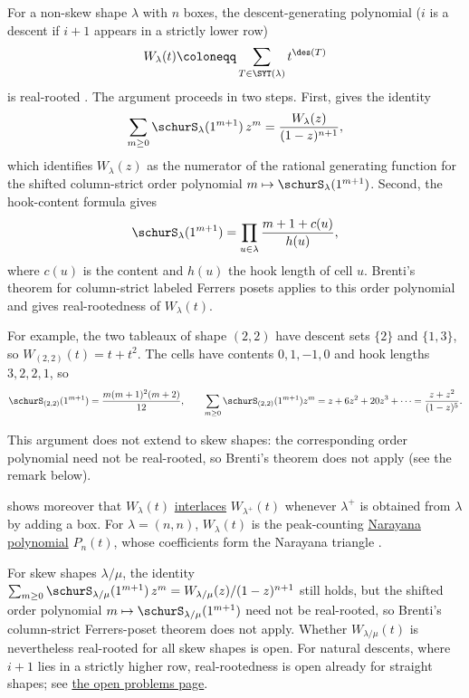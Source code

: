 \begin{example*}

For a non-skew shape $\lambda$ with $n$ boxes, the descent-generating polynomial
($i$ is a descent if $i+1$ appears in a strictly lower row)
\[
   W_\lambda(t) \coloneqq \sum_{T \in \SYT(\lambda)} t^{\des(T)}
\]
is real-rooted \cite[p.~60, proof of Thm.~5.3.2]{Brenti1989}.
The argument proceeds in two steps.
First, \cite[Eq. (7.96)]{StanleyEC2} gives the identity
\[
  \sum_{m \geq 0} \schurS_{\lambda}(1^{m+1})\,z^m
  = \frac{W_\lambda(z)}{(1-z)^{n+1}},
\]
which identifies $W_\lambda(z)$ as the numerator of the rational generating
function for the shifted column-strict order polynomial
$m \mapsto \schurS_\lambda(1^{m+1})$.
Second, the hook-content formula gives
\[
  \schurS_\lambda(1^{m+1})
  = \prod_{u \in \lambda} \frac{m+1+c(u)}{h(u)},
\]
where $c(u)$ is the content and $h(u)$ the hook length of cell $u$.
Brenti's theorem for column-strict labeled Ferrers posets applies to this
order polynomial and gives real-rootedness of $W_\lambda(t)$.

For example, the two tableaux of shape $(2,2)$ have descent sets $\{2\}$ and
$\{1,3\}$, so $W_{(2,2)}(t)=t+t^2$.  The cells have contents $0,1,-1,0$ and
hook lengths $3,2,2,1$, so
\[
  \schurS_{(2,2)}(1^{m+1})=\frac{m(m+1)^2(m+2)}{12},
  \qquad
  \sum_{m\geq0}\schurS_{(2,2)}(1^{m+1})z^m=z+6z^2+20z^3+\dotsb
  =\frac{z+z^2}{(1-z)^5}.
\]

This argument does not extend to skew shapes: the corresponding order
polynomial need not be real-rooted, so Brenti's theorem does not apply
(see the remark below).

\cite{Branden2004operators} shows moreover that $W_\lambda(t)$ \hyperref[interlacingPolynomials]{interlaces}
$W_{\lambda^+}(t)$ whenever $\lambda^+$ is obtained from $\lambda$ by adding a box.
For $\lambda=(n,n)$, $W_\lambda(t)$ is the peak-counting
\hyperref[realRootedCatalan]{Narayana polynomial} $P_n(t)$, whose
coefficients form the Narayana triangle .
\end{example*}


\begin{remark*}
For skew shapes $\lambda/\mu$, the identity
$\sum_{m\geq 0} \schurS_{\lambda/\mu}(1^{m+1})\,z^m
=W_{\lambda/\mu}(z)/(1-z)^{n+1}$ still holds, but the shifted order polynomial
$m \mapsto \schurS_{\lambda/\mu}(1^{m+1})$ need not be real-rooted,
so Brenti's column-strict Ferrers-poset theorem does not apply.
Whether $W_{\lambda/\mu}(t)$ is nevertheless real-rooted for all skew shapes is open.
For natural descents, where $i+1$ lies in a strictly higher row, real-rootedness
is open already for straight shapes; see
\hyperref[conjSYTNaturalDescents]{the open problems page}.
\end{remark*}


